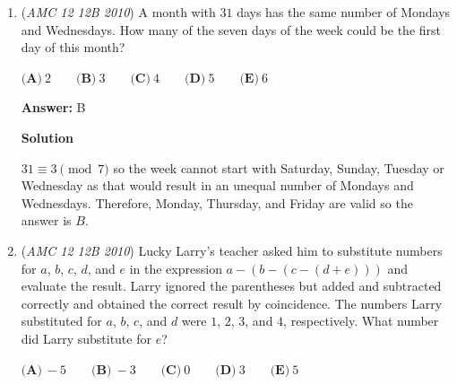 \begin{enumerate}
 $\textbf{(A)}\ 1 \qquad \textbf{(B)}\ 2 \qquad \textbf{(C)}\ 3 \qquad \textbf{(D)}\ 4 \qquad \textbf{(E)}\ 5$

 \textbf{Answer: }E



\textbf{Solution}

We find the greatest common factor of $48$ and $64$ to be $16$. The number of factors of $16$ is $5$ which is the answer $(E)$.

 



\textbf{Solution 2}

Since the price of one ticket is a whole number, it must be a divisor of both $48$ and $64$. An integer is a common divisor of two numbers if and only if it is divisible by their difference. Hence, all the possible prices are positive divisors of $16$, or $1$, $2$, $4$, $8$, and $16$, making the answer $5$, or E. - By Monkey\_King

 


	\item (\textit{AMC 12 12B 2010}) A month with $31$ days has the same number of Mondays and Wednesdays. How many of the seven days of the week could be the first day of this month?


 $\textbf{(A)}\ 2 \qquad \textbf{(B)}\ 3 \qquad \textbf{(C)}\ 4 \qquad \textbf{(D)}\ 5 \qquad \textbf{(E)}\ 6$

 \textbf{Answer: }B



\textbf{Solution}

$31 \equiv 3 \pmod {7}$ so the week cannot start with Saturday, Sunday, Tuesday or Wednesday as that would result in an unequal number of Mondays and Wednesdays. Therefore, Monday, Thursday, and Friday are valid so the answer is $\boxed{B}$.

 


	\item (\textit{AMC 12 12B 2010}) Lucky Larry's teacher asked him to substitute numbers for $a$, $b$, $c$, $d$, and $e$ in the expression $a-(b-(c-(d+e)))$ and evaluate the result. Larry ignored the parentheses but added and subtracted correctly and obtained the correct result by coincidence. The numbers Larry substituted for $a$, $b$, $c$, and $d$ were $1$, $2$, $3$, and $4$, respectively. What number did Larry substitute for $e$?


 $\textbf{(A)}\ -5 \qquad \textbf{(B)}\ -3 \qquad \textbf{(C)}\ 0 \qquad \textbf{(D)}\ 3 \qquad \textbf{(E)}\ 5$


\end{enumerate}
